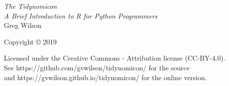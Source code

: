 {\Huge\itshape The Tidynomicon}\\[\baselineskip]

{\large\itshape
  A Brief Introduction to R for Python Programmers
}\\[0.2\textheight]

{\large Greg Wilson}\par

\vfill

{\large Copyright {\copyright} 2019}

\vspace*{\baselineskip}


\vspace*{\baselineskip}

{\small
  Licensed under the Creative Commons - Attribution license (CC-BY-4.0).
  \\
  See https://github.com/gvwilson/tidynomicon/ for the source\\
  and https://gvwilson.github.io/tidynomicon/ for the online version.
}
